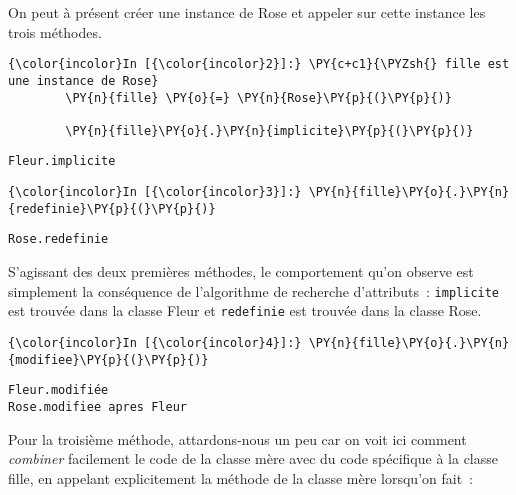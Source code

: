     On peut à présent créer une instance de Rose et appeler sur cette
instance les trois méthodes.

    \begin{Verbatim}[commandchars=\\\{\}]
{\color{incolor}In [{\color{incolor}2}]:} \PY{c+c1}{\PYZsh{} fille est une instance de Rose}
        \PY{n}{fille} \PY{o}{=} \PY{n}{Rose}\PY{p}{(}\PY{p}{)}
        
        \PY{n}{fille}\PY{o}{.}\PY{n}{implicite}\PY{p}{(}\PY{p}{)}
\end{Verbatim}


    \begin{Verbatim}[commandchars=\\\{\}]
Fleur.implicite

    \end{Verbatim}

    \begin{Verbatim}[commandchars=\\\{\}]
{\color{incolor}In [{\color{incolor}3}]:} \PY{n}{fille}\PY{o}{.}\PY{n}{redefinie}\PY{p}{(}\PY{p}{)}
\end{Verbatim}


    \begin{Verbatim}[commandchars=\\\{\}]
Rose.redefinie

    \end{Verbatim}

    S'agissant des deux premières méthodes, le comportement qu'on observe
est simplement la conséquence de l'algorithme de recherche d'attributs~:
\texttt{implicite} est trouvée dans la classe Fleur et
\texttt{redefinie} est trouvée dans la classe Rose.

    \begin{Verbatim}[commandchars=\\\{\}]
{\color{incolor}In [{\color{incolor}4}]:} \PY{n}{fille}\PY{o}{.}\PY{n}{modifiee}\PY{p}{(}\PY{p}{)}
\end{Verbatim}


    \begin{Verbatim}[commandchars=\\\{\}]
Fleur.modifiée
Rose.modifiee apres Fleur

    \end{Verbatim}

    Pour la troisième méthode, attardons-nous un peu car on voit ici comment
\emph{combiner} facilement le code de la classe mère avec du code
spécifique à la classe fille, en appelant explicitement la méthode de la
classe mère lorsqu'on fait~:


